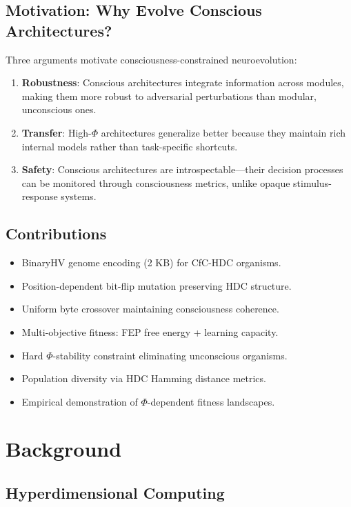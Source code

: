 \documentclass[11pt,a4paper]{article}
\begin{document}
\subsection{Motivation: Why Evolve Conscious Architectures?}

Three arguments motivate consciousness-constrained neuroevolution:

\begin{enumerate}[nosep]
    \item \textbf{Robustness}: Conscious architectures integrate information across modules, making them more robust to adversarial perturbations than modular, unconscious ones.
    \item \textbf{Transfer}: High-$\Phi$ architectures generalize better because they maintain rich internal models rather than task-specific shortcuts.
    \item \textbf{Safety}: Conscious architectures are introspectable---their decision processes can be monitored through consciousness metrics, unlike opaque stimulus-response systems.
\end{enumerate}

\subsection{Contributions}

\begin{itemize}[nosep]
    \item BinaryHV genome encoding (2 KB) for CfC-HDC organisms.
    \item Position-dependent bit-flip mutation preserving HDC structure.
    \item Uniform byte crossover maintaining consciousness coherence.
    \item Multi-objective fitness: FEP free energy + learning capacity.
    \item Hard $\Phi$-stability constraint eliminating unconscious organisms.
    \item Population diversity via HDC Hamming distance metrics.
    \item Empirical demonstration of $\Phi$-dependent fitness landscapes.
\end{itemize}

\section{Background}

\subsection{Hyperdimensional Computing}
\end{document}
